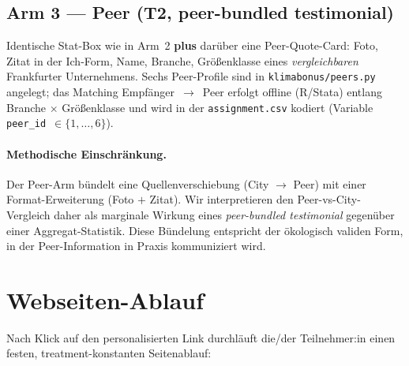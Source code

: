 \documentclass[11pt, a4paper]{scrartcl}
\newcommand{\var}[1]{\texttt{\small #1}}
\begin{document}
\subsection*{Arm 3 --- Peer (T2, peer-bundled testimonial)}
Identische Stat-Box wie in Arm~2 \textbf{plus} darüber eine Peer-Quote-Card:
Foto, Zitat in der Ich-Form, Name, Branche, Größenklasse eines
\emph{vergleichbaren} Frankfurter Unternehmens. Sechs Peer-Profile sind in
\var{klimabonus/peers.py} angelegt; das Matching Empfänger~$\rightarrow$~Peer
erfolgt offline (R/Stata) entlang Branche $\times$ Größenklasse und wird
in der \var{assignment.csv} kodiert (Variable \var{peer\_id}~$\in \{1,\ldots,6\}$).

\paragraph{Methodische Einschränkung.} Der Peer-Arm bündelt eine
Quellenverschiebung (City $\rightarrow$ Peer) mit einer Format-Erweiterung
(Foto $+$ Zitat). Wir interpretieren den Peer-vs-City-Vergleich daher als
marginale Wirkung eines \emph{peer-bundled testimonial} gegenüber einer
Aggregat-Statistik. Diese Bündelung entspricht der ökologisch validen Form,
in der Peer-Information in Praxis kommuniziert wird.

\section{Webseiten-Ablauf}

Nach Klick auf den personalisierten Link durchläuft die/der
Teilnehmer:in einen festen, treatment-konstanten Seitenablauf:
\end{document}
